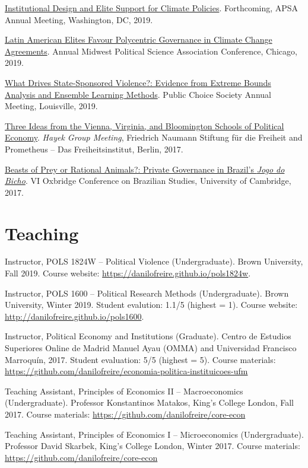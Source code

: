 \documentclass[a4paper]{article}
\renewenvironment{itemize}{
	\begin{list}{}{
			\setlength{\leftmargin}{1.5em}
		}
		}{
	\end{list}
}
\begin{document}
	\begin{itemize}
		\item \href{https://osf.io/9a6ch}{Institutional Design and Elite Support for Climate Policies}. Forthcoming, APSA Annual Meeting, Washington, DC, 2019.
		\item \href{https://osf.io/9a6ch}{Latin American Elites Favour Polycentric Governance in Climate Change Agreements}. Annual Midwest Political Science Association Conference, Chicago, 2019.
		\item \href{http://danilofreire.github.io/pcs-2019}{What Drives State-Sponsored Violence?: Evidence from Extreme Bounds Analysis and Ensemble Learning Methods}. Public Choice Society Annual Meeting, Louisville, 2019.
		\item \href{https://www.overleaf.com/project/591ef5259fb58ede3dc4d369}{Three Ideas from the Vienna, Virginia, and Bloomington Schools of Political Economy}. \textit{Hayek Group Meeting}, Friedrich Naumann Stiftung f{\"u}r die Freiheit and Prometheus -- Das Freiheitsinstitut, Berlin, 2017.
		\item \href{https://osf.io/se2jr}{Beasts of Prey or Rational Animals?: Private Governance in Brazil's \emph{Jogo do Bicho}}. VI Oxbridge Conference on Brazilian Studies, University of Cambridge, 2017.
	\end{itemize}

	\section*{Teaching}

	\begin{itemize}
		\item Instructor, POLS 1824W -- Political Violence (Undergraduate). Brown University, Fall 2019. Course website: \href{https://danilofreire.github.io/pols1824w}{https://danilofreire.github.io/pols1824w}.
		\item Instructor, POLS 1600 -- Political Research Methods (Undergraduate). Brown University, Winter 2019. Student evalution: 1.1/5 (highest = 1). Course website: \href{https://danilofreire.github.io/pols1600}{http://danilofreire.github.io/pols1600}.
		\item Instructor, Political Economy and Institutions (Graduate). Centro de Estudios Superiores Online de Madrid Manuel Ayau (OMMA) and Universidad Francisco Marroquín, 2017. Student evaluation: 5/5 (highest = 5). Course materials: \href{https://github.com/danilofreire/economia-politica-instituicoes-ufm}{https://github.com/danilofreire/economia-politica-instituicoes-ufm}
		\item Teaching Assistant, Principles of Economics II -- Macroeconomics (Undergraduate). Professor Konstantinos Matakos, King's College London, Fall 2017. Course materials: \href{https://github.com/danilofreire/core-econ}{https://github.com/danilofreire/core-econ}
		\item Teaching Assistant, Principles of Economics I -- Microeconomics (Undergraduate). Professor David Skarbek, King's College London, Winter 2017. Course materials: \href{https://github.com/danilofreire/core-econ}{https://github.com/danilofreire/core-econ}
	\end{itemize}
\end{document}
